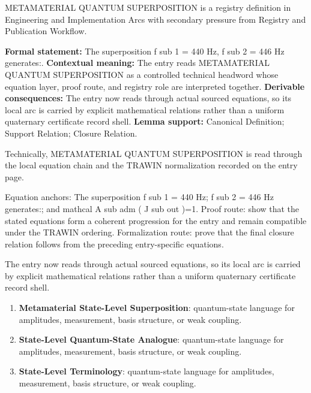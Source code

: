 
\begingroup\small
{}
METAMATERIAL QUANTUM SUPERPOSITION is a registry definition in Engineering and Implementation Arcs with secondary pressure from Registry and Publication Workflow.

\begingroup\footnotesize\setlength{\emergencystretch}{3em}\sloppy
\textbf{Formal statement:} The superposition f sub 1 = 440 Hz, f sub 2 = 446 Hz generates:. \textbf{Contextual meaning:} The entry reads METAMATERIAL QUANTUM SUPERPOSITION as a controlled technical headword whose equation layer, proof route, and registry role are interpreted together. \textbf{Derivable consequences:} The entry now reads through actual sourced equations, so its local arc is carried by explicit mathematical relations rather than a uniform quaternary certificate record shell. \textbf{Lemma support:} Canonical Definition; Support Relation; Closure Relation.\par
\endgroup

Technically, METAMATERIAL QUANTUM SUPERPOSITION is read through the local equation chain and the TRAWIN normalization recorded on the entry page.

Equation anchors: The superposition f sub 1 = 440 Hz; f sub 2 = 446 Hz generates:; and mathcal A sub adm ( J sub out )=1. Proof route: show that the stated equations form a coherent progression for the entry and remain compatible under the TRAWIN ordering. Formalization route: prove that the final closure relation follows from the preceding entry-specific equations.

The entry now reads through actual sourced equations, so its local arc is carried by explicit mathematical relations rather than a uniform quaternary certificate record shell.
\endgroup

\begin{enumerate}[leftmargin=1.6em,itemsep=6pt,topsep=4pt]
\item \textbf{Metamaterial State-Level Superposition}: quantum-state language for amplitudes, measurement, basis structure, or weak coupling.
\item \textbf{State-Level Quantum-State Analogue}: quantum-state language for amplitudes, measurement, basis structure, or weak coupling.
\item \textbf{State-Level Terminology}: quantum-state language for amplitudes, measurement, basis structure, or weak coupling.
\end{enumerate}

